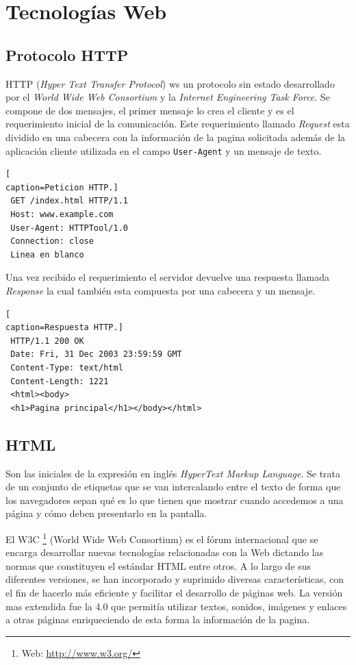 \section{Tecnologías Web}
\subsection*{Protocolo HTTP}
HTTP (\textit{Hyper Text Transfer Protocol}) ws un protocolo sin estado desarrollado por el \textit{World Wide Web Consortium} y la \textit{Internet Engineering Task Force}. Se compone de dos mensajes, el primer mensaje lo crea el cliente y es el requerimiento inicial de la comunicación. Este requerimiento llamado \textit{Request} esta dividido en una cabecera con la información de la pagina solicitada además de la aplicación cliente utilizada en el campo \texttt{User-Agent} y un mensaje de texto.
\begin{lstlisting}[
caption=Peticion HTTP.]
 GET /index.html HTTP/1.1
 Host: www.example.com
 User-Agent: HTTPTool/1.0
 Connection: close
 Linea en blanco
\end{lstlisting}
Una vez recibido el requerimiento el servidor devuelve una respuesta llamada \textit{Response} la cual también esta compuesta por una cabecera y un mensaje.
\begin{lstlisting}[
caption=Respuesta HTTP.]
 HTTP/1.1 200 OK
 Date: Fri, 31 Dec 2003 23:59:59 GMT
 Content-Type: text/html
 Content-Length: 1221
 <html><body>
 <h1>Pagina principal</h1></body></html>
\end{lstlisting}
\subsection*{HTML}
Son las iniciales de la expresión en inglés \textit{HyperText Markup Language}. Se trata de un conjunto de etiquetas que se van intercalando entre el texto de forma que los navegadores sepan qué es lo que tienen que mostrar cuando accedemos a una página y cómo deben presentarlo en la pantalla.

El W3C \footnote{Web: \url{http://www.w3.org/}} (World Wide Web Consortium) es el fórum internacional que se encarga desarrollar nuevas tecnologías relacionadas con la Web dictando las normas que constituyen el estándar HTML entre otros. A lo largo de sus diferentes versiones, se han incorporado y suprimido diversas características, con el fin de hacerlo más eficiente y facilitar el desarrollo de páginas web. La versión mas extendida fue la 4.0 que permitía utilizar textos, sonidos, imágenes y enlaces a otras páginas enriqueciendo de esta forma la información de la pagina.

